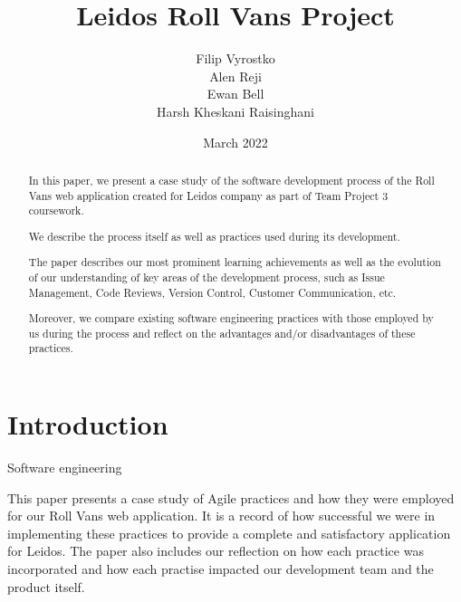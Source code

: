 \documentclass{l3proj}
\begin{document}
\title{Leidos Roll Vans Project}

\author{Filip Vyrostko \\
        Alen Reji \\
        Ewan Bell \\
        Harsh Kheskani Raisinghani}

\date{March 2022}

\maketitle

\begin{abstract}

In this paper, we present a case study of the software development process of the Roll Vans web application created for Leidos company as part of Team Project 3 coursework.


We describe the process itself as well as practices used during its development.


The paper describes our most prominent learning achievements as well as the evolution of our understanding of key areas of the development process, such as Issue Management, Code Reviews, Version Control, Customer Communication, etc.

 
Moreover, we compare existing software engineering practices with those employed by us during the process and reflect on the advantages and/or disadvantages of these practices.

\end{abstract}

\educationalconsent

\newpage

\section{Introduction}

Software engineering 

This paper presents a case study of Agile practices and how they were employed for our Roll Vans web application. It is a record of how successful we were in implementing these practices to provide a complete and satisfactory application for Leidos. The paper also includes our reflection on how each practice was incorporated and how each practise impacted our development team and the product itself.
\end{document}
